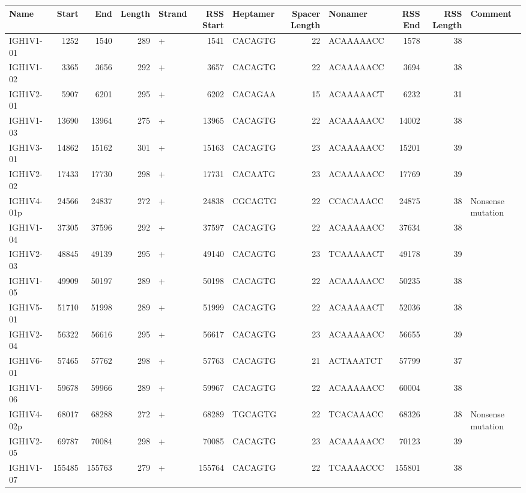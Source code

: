 \begin{tabular}{lrrrlrlrlrrl}
  \toprule Name & Start & End & Length & Strand & RSS Start & Heptamer & Spacer Length & Nonamer & RSS End & RSS Length & Comment \\ 
  \midrule IGH1V1-01 & 1252 & 1540 & 289 & + & 1541 & CACAGTG & 22 & ACAAAAACC & 1578 & 38 &  \\ 
  IGH1V1-02 & 3365 & 3656 & 292 & + & 3657 & CACAGTG & 22 & ACAAAAACC & 3694 & 38 &  \\ 
  IGH1V2-01 & 5907 & 6201 & 295 & + & 6202 & CACAGAA & 15 & ACAAAAACT & 6232 & 31 &  \\ 
  IGH1V1-03 & 13690 & 13964 & 275 & + & 13965 & CACAGTG & 22 & ACAAAAACC & 14002 & 38 &  \\ 
  IGH1V3-01 & 14862 & 15162 & 301 & + & 15163 & CACAGTG & 23 & ACAAAAACC & 15201 & 39 &  \\ 
  IGH1V2-02 & 17433 & 17730 & 298 & + & 17731 & CACAATG & 23 & ACAAAAACC & 17769 & 39 &  \\ 
  IGH1V4-01p & 24566 & 24837 & 272 & + & 24838 & CGCAGTG & 22 & CCACAAACC & 24875 & 38 & Nonsense mutation \\ 
  IGH1V1-04 & 37305 & 37596 & 292 & + & 37597 & CACAGTG & 22 & ACAAAAACC & 37634 & 38 &  \\ 
  IGH1V2-03 & 48845 & 49139 & 295 & + & 49140 & CACAGTG & 23 & TCAAAAACT & 49178 & 39 &  \\ 
  IGH1V1-05 & 49909 & 50197 & 289 & + & 50198 & CACAGTG & 22 & ACAAAAACC & 50235 & 38 &  \\ 
  IGH1V5-01 & 51710 & 51998 & 289 & + & 51999 & CACAGTG & 22 & ACAAAAACT & 52036 & 38 &  \\ 
  IGH1V2-04 & 56322 & 56616 & 295 & + & 56617 & CACAGTG & 23 & ACAAAAACC & 56655 & 39 &  \\ 
  IGH1V6-01 & 57465 & 57762 & 298 & + & 57763 & CACAGTG & 21 & ACTAAATCT & 57799 & 37 &  \\ 
  IGH1V1-06 & 59678 & 59966 & 289 & + & 59967 & CACAGTG & 22 & ACAAAAACC & 60004 & 38 &  \\ 
  IGH1V4-02p & 68017 & 68288 & 272 & + & 68289 & TGCAGTG & 22 & TCACAAACC & 68326 & 38 & Nonsense mutation \\ 
  IGH1V2-05 & 69787 & 70084 & 298 & + & 70085 & CACAGTG & 23 & ACAAAAACC & 70123 & 39 &  \\ 
  IGH1V1-07 & 155485 & 155763 & 279 & + & 155764 & CACAGTG & 22 & TCAAAACCC & 155801 & 38 &  \\ 

\end{tabular}
